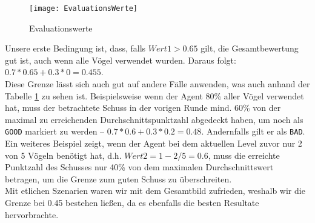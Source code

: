 \begin{figure}[H]
  \centering
    \texttt{[image: EvaluationsWerte]}
   \caption{Evaluationswerte}
   \label{evaluation}
\end{figure}

Unsere erste Bedingung ist, dass, falls $Wert1 > 0.65$ gilt, die Gesamtbewertung gut ist, auch wenn alle Vögel verwendet wurden. Daraus folgt: $0.7 * 0.65 + 0.3 * 0 = 0.455$. \\
Diese Grenze lässt sich auch gut auf andere Fälle anwenden, was auch anhand der Tabelle \ref{evaluation} zu sehen ist. Beispielsweise wenn der Agent 80\% aller Vögel verwendet hat, muss der betrachtete Schuss in der vorigen Runde mind. 60\% von der maximal zu erreichenden Durchschnittspunktzahl abgedeckt haben, um noch als \texttt{GOOD} markiert zu werden -- $0.7 * 0.6 + 0.3 * 0.2 = 0.48$. Andernfalls gilt er als \texttt{BAD}. \\ Ein weiteres Beispiel zeigt, wenn der Agent bei dem aktuellen Level zuvor nur 2 von 5 Vögeln benötigt hat, d.h. $Wert2 = 1 - 2/5 = 0.6$, muss die erreichte Punktzahl des Schusses nur 40\% von dem maximalen Durchschnittswert betragen, um die Grenze zum guten Schuss zu überschreiten. \\
Mit etlichen Szenarien waren wir mit dem Gesamtbild zufrieden, weshalb wir die Grenze bei 0.45 bestehen lie\ss en, da es ebenfalls die besten Resultate hervorbrachte.